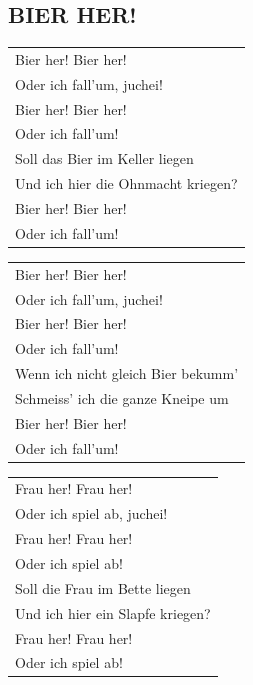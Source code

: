 \documentclass[a4paper, 14pt]{extarticle}
\begin{document}
\subsection*{BIER HER!}
\begin{flushleft}
\begin{tabularx}{\textwidth} {
    >{\raggedright\arraybackslash}X}
Bier her! Bier her!\\
Oder ich fall’um, juchei!\\
Bier her! Bier her!\\
Oder ich fall’um!\\
Soll das Bier im Keller liegen\\
Und ich hier die Ohnmacht kriegen?\\
Bier her! Bier her!\\
Oder ich fall’um!\\
\end{tabularx}
\end{flushleft}
\begin{flushleft}
\begin{tabularx}{\textwidth} {
    >{\raggedright\arraybackslash}X}
Bier her! Bier her!\\
Oder ich fall’um, juchei!\\
Bier her! Bier her!\\
Oder ich fall’um!\\
Wenn ich nicht gleich Bier bekumm’\\
Schmeiss’ ich die ganze Kneipe um\\
Bier her! Bier her!\\
Oder ich fall’um!\\
\end{tabularx}
\end{flushleft}
\begin{flushleft}
\begin{tabularx}{\textwidth} {
    >{\raggedright\arraybackslash}X}
Frau her! Frau her!\\
Oder ich spiel ab, juchei!\\
Frau her! Frau her!\\
Oder ich spiel ab!\\
Soll die Frau im Bette liegen\\
Und ich hier ein Slapfe kriegen?\\
Frau her! Frau her!\\
Oder ich spiel ab!\\
\end{tabularx}
\end{flushleft}
\end{document}
